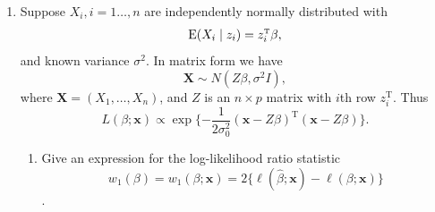 \documentclass[12pt]{article}
\def\E{{\rm E}}
\def\T{{ \mathrm{\scriptscriptstyle T} }}
\def\bs#1{{\boldsymbol{#1}}}
\begin{document}
\begin{enumerate}
\textcolor{red}{Rewrite 
\small
\begin{align*}
    R_\theta(\hat\theta) &= \sum_{i=1}^n E\left[\left(X_i - \theta_i - b \frac{X_i}{\sum_{j=1}^n X_j^2}\right)^2\right]\\
    &= \sum_{i=1}^n E((X_i - \theta_i)^2) - 2b \sum_{i=1}^n E\left[(X_i - \theta_j ) \frac{X_i}{\sum_{j=1}^n X_j^2}\right] + b^2 \sum_{i=1}^n E\left(\frac{X_i^2}{(\sum_{j=1}^n X_j^2)^2}\right)
\end{align*}
\normalsize
Let $g(X_i) = \frac{X_i}{\sum_{j=1}^n X_j^2}$. Since $X_i \sim \mathcal N(0, 1)$, $g$ is absolutely continuous, then by Stein's identity, 
\begin{equation*}
    E((X_i - \theta_i)g(X_i)) = E(g'(X_i)) = E\left[\frac{1}{\sum_{j=1}^n X_j^2} - \frac{2X_i^2}{\left(\sum_{j=1}^n X_j^2\right)^2}\right]
\end{equation*}
thus 
\begin{equation*}
    R_\theta(\hat\theta) = n - 2b n E\left(\frac{1}{\sum_{j=1}^n X_j^2}\right) + (b^2 + 4b) E\left(\frac{1}{\sum_{j=1}^n X_j^2}\right)
\end{equation*}
so 
\begin{align*}
    \frac{\partial R_\theta}{\partial b} &= (2b + 4) E\left(\frac{1}{\sum_{j=1}^n X_j^2}\right)- 2n E\left(\frac{1}{\sum_{j=1}^n }X_j^2\right)\\
    &= (2b + 4 - 2n)E\left(\frac{1}{\sum_{j=1}^n X_j^2}\right) \\
    &= 0 \text{ if $b = n-2$}
\end{align*}
Taking the second derivative, 
\begin{equation*}
    \frac{\partial ^2 R_\theta}{\partial b^2} = 2E\left(\frac{1}{\sum_{j=1}^n X_j^2}\right) 
\end{equation*}
which is greater than 0 at $b = n-2$, thus $R_\theta$ is minimized in $b$ at $b = n-2$. 
}
\item Suppose $X_i, i = 1 \dots, n$ are independently normally distributed with $$\E(X_i\mid z_i) = z_i^\T\beta,$$ and known variance $\sigma^2$. In matrix form we have $$\bs X \sim N(Z\beta, \sigma^2 I),$$ where $\bs X = (X_1, \dots, X_n)$, and $Z$ is an $n \times p$ matrix with $i$th row $z_i^\T$. Thus $$L(\beta; \bs x) \propto  \exp\{-\frac{1}{2\sigma_0^2}(\bs x - Z \beta)^\T(\bs x - Z\beta)\}.$$\begin{enumerate}
 \item 	 Give an expression for the log-likelihood ratio statistic 
$$w_1(\beta) = w_1(\beta;\bs x) = 2\{\ell(\hat\beta;\bs{x})-\ell(\beta; \bs{x})\}$$.

\end{enumerate}
\end{enumerate}
\end{document}
